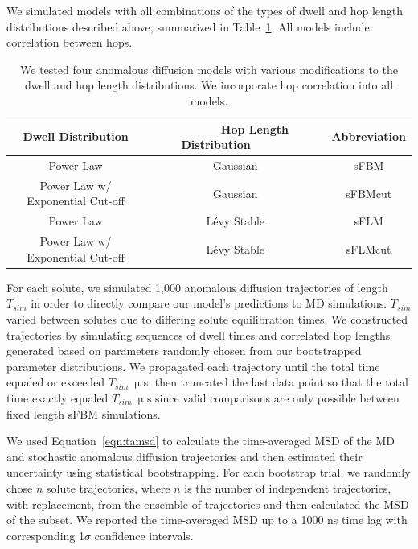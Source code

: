 \documentclass[journal=jctcce,manuscript=article]{achemso}
\begin{document}
  We simulated models with all combinations of the types of dwell and hop length
  distributions described above, summarized in Table~\ref{table:anomalous_models}.
  All models include correlation between hops.

  \begin{table}[!htb]
	  \centering
	  \begin{tabular}{ccc}
            \hline
	  \hline
	  Dwell Distribution                & ~~~~~~Hop Length Distribution~~~~~~ & Abbreviation \\
	  \hline
      Power Law                         & Gaussian                & sFBM         \\
      Power Law w/ Exponential Cut-off  & Gaussian                & sFBMcut      \\
      Power Law                         & L\'evy Stable           & sFLM         \\
      Power Law w/ Exponential Cut-off  & L\'evy Stable           & sFLMcut      \\
	  \hline
          \hline
	  \end{tabular}
	  \caption{We tested four anomalous diffusion models with various modifications 
	  to the dwell and hop length distributions. We incorporate hop correlation 
	  into all models.}\label{table:anomalous_models}
          
 \end{table}

  For each solute, we simulated 1,000 anomalous diffusion trajectories of
  length $T_{sim}$ in order to directly compare our model's predictions to MD
  simulations. $T_{sim}$ varied between solutes due to differing solute
  equilibration times. We constructed trajectories by simulating sequences of
  dwell times and correlated hop lengths generated based on parameters randomly
  chosen from our bootstrapped parameter distributions. We propagated each
  trajectory until the total time equaled or exceeded $T_{sim}~ \upmu$s, then
  truncated the last data point so that the total time exactly equaled
  $T_{sim}~ \upmu$s since valid comparisons are only possible between fixed
  length sFBM simulations. 
  
  We used Equation~\ref{eqn:tamsd} to calculate the time-averaged MSD of the MD
  and stochastic anomalous diffusion trajectories and then estimated their 
  uncertainty using statistical bootstrapping. For each bootstrap trial, we 
  randomly chose $n$ solute trajectories, where $n$ is the number of independent
  trajectories, with replacement, from the ensemble of trajectories and then 
  calculated the MSD of the subset. We reported the time-averaged MSD up to a 
  1000 ns time lag with corresponding 1$\sigma$ confidence intervals. 
\end{document}
